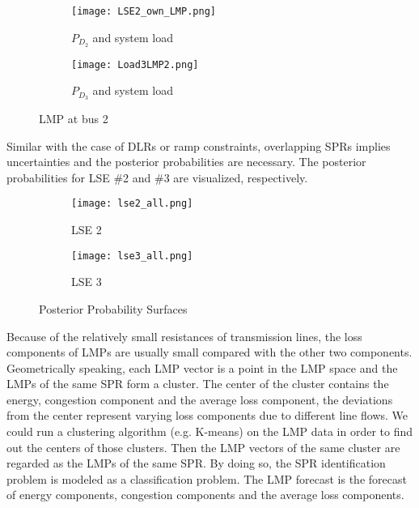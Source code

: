\documentclass[letterpaper, 11pt]{article}
\theoremstyle{plain}
\theoremstyle{definition}
\begin{document}
\begin{figure}[htbp]
  \centering
  \begin{subfigure}[t]{0.49\linewidth}
  \centering
  \texttt{[image: LSE2\_own\_LMP.png]}
  \caption{$P_{D_2}$ and system load}
  \label{fig:LSE2_own_LMP.png}
  \end{subfigure}
  \begin{subfigure}[t]{0.49\linewidth}
  \centering
  \texttt{[image: Load3LMP2.png]}
  \caption{$P_{D_3}$ and system load}
  \label{fig:Load3LMP2}
  \end{subfigure}
  \caption{LMP at bus 2}
\end{figure}

Similar with the case of DLRs or ramp constraints, overlapping SPRs implies uncertainties and the posterior probabilities are necessary. The posterior probabilities for LSE \#2 and \#3 are visualized, respectively.
\begin{figure}[htbp]
  \centering
  \begin{subfigure}[t]{0.49\linewidth}
  \centering
  \texttt{[image: lse2\_all.png]}
  \caption{LSE 2}
  \end{subfigure}
  \begin{subfigure}[t]{0.49\linewidth}
  \centering
  \texttt{[image: lse3\_all.png]} 
  \caption{LSE 3}
  \end{subfigure}
  \caption{Posterior Probability Surfaces}
  \label{fig:posterior_prob_3lses}
\end{figure}




Because of the relatively small resistances of transmission lines, the loss components of LMPs are usually small compared with the other two components. 
Geometrically speaking, each LMP vector is a point in the LMP space and the LMPs of the same SPR form a cluster. The center of the cluster contains the energy, congestion component and the average loss component, 
the deviations from the center represent varying loss components due to different line flows.
We could run a clustering algorithm (e.g. K-means) on the LMP data in order to find out the centers of those clusters. Then the LMP vectors of the same cluster are regarded as the LMPs of the same SPR. By doing so, the SPR identification problem is modeled as a classification problem. The LMP forecast is the forecast of energy components, congestion components and the average loss components.
\end{document}
